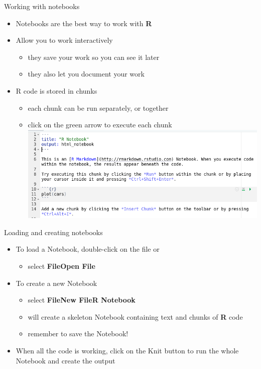 \documentclass[
  ignorenonframetext,
  aspectratio=169]{beamer}
\providecommand{\tightlist}{%
  \setlength{\itemsep}{0pt}\setlength{\parskip}{0pt}}
\begin{document}
\begin{frame}{Working with notebooks}
\protect\hypertarget{working-with-notebooks}{}
\begin{itemize}
\tightlist
\item
  Notebooks are the best way to work with \textbf{R}
\item
  Allow you to work interactively

  \begin{itemize}
  \tightlist
  \item
    they save your work so you can see it later
  \item
    they also let you document your work
  \end{itemize}
\item
  R code is stored in chunks

  \begin{itemize}
  \tightlist
  \item
    each chunk can be run separately, or together
  \item
    click on the green arrow to execute each chunk
    \includegraphics{figures/Notebook.png}
  \end{itemize}
\end{itemize}
\end{frame}

\begin{frame}{Loading and creating notebooks}
\protect\hypertarget{loading-and-creating-notebooks}{}
\begin{itemize}
\tightlist
\item
  To load a Notebook, double-click on the file or

  \begin{itemize}
  \tightlist
  \item
    select \textbf{File\textbar Open File}
  \end{itemize}
\item
  To create a new Notebook

  \begin{itemize}
  \tightlist
  \item
    select \textbf{File\textbar New File\textbar R Notebook}
  \item
    will create a skeleton Notebook containing text and chunks of
    \textbf{R} code
  \item
    remember to save the Notebook!
  \end{itemize}
\item
  When all the code is working, click on the Knit button to run the
  whole Notebook and create the output
\end{itemize}
\end{frame}
\end{document}
